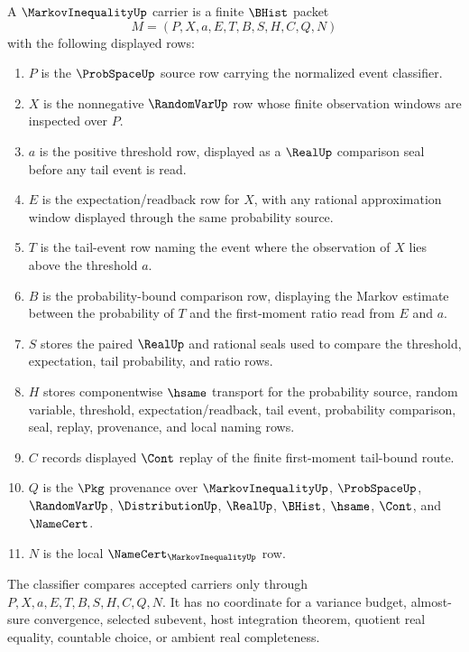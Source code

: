 \begin{definition}\label{def:markov-inequality-carrier}
A $\MarkovInequalityUp$ carrier is a finite $\BHist$ packet
$$
M=(P,X,a,E,T,B,S,H,C,Q,N)
$$
with the following displayed rows:
\begin{enumerate}
\item $P$ is the $\ProbSpaceUp$ source row carrying the normalized event classifier.
\item $X$ is the nonnegative $\RandomVarUp$ row whose finite observation windows are inspected over $P$.
\item $a$ is the positive threshold row, displayed as a $\RealUp$ comparison seal before any tail event is read.
\item $E$ is the expectation/readback row for $X$, with any rational approximation window displayed through the same probability source.
\item $T$ is the tail-event row naming the event where the observation of $X$ lies above the threshold $a$.
\item $B$ is the probability-bound comparison row, displaying the Markov estimate between the probability of $T$ and the first-moment ratio read from $E$ and $a$.
\item $S$ stores the paired $\RealUp$ and rational seals used to compare the threshold, expectation, tail probability, and ratio rows.
\item $H$ stores componentwise $\hsame$ transport for the probability source, random variable, threshold, expectation/readback, tail event, probability comparison, seal, replay, provenance, and local naming rows.
\item $C$ records displayed $\Cont$ replay of the finite first-moment tail-bound route.
\item $Q$ is the $\Pkg$ provenance over $\MarkovInequalityUp$, $\ProbSpaceUp$, $\RandomVarUp$, $\DistributionUp$, $\RealUp$, $\BHist$, $\hsame$, $\Cont$, and $\NameCert$.
\item $N$ is the local $\NameCert_{\MarkovInequalityUp}$ row.
\end{enumerate}
The classifier compares accepted carriers only through $P,X,a,E,T,B,S,H,C,Q,N$. It has no coordinate for a variance budget, almost-sure convergence, selected subevent, host integration theorem, quotient real equality, countable choice, or ambient real completeness.
\end{definition}


